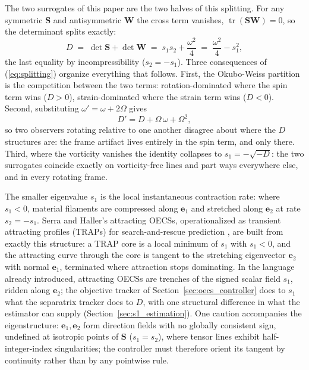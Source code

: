 \documentclass[lettersize,journal]{IEEEtran}
\begin{document}
The two surrogates of this paper are the two halves of this splitting.
For any symmetric $\mathbf{S}$ and antisymmetric $\mathbf{W}$ the cross
term vanishes, $\operatorname{tr}(\mathbf{S}\mathbf{W}) = 0$, so the
determinant splits exactly:
\begin{equation}
    D \;=\; \det\mathbf{S} + \det\mathbf{W}
      \;=\; s_1 s_2 + \frac{\omega^2}{4}
      \;=\; \frac{\omega^2}{4} - s_1^2,
    \label{eq:splitting}
\end{equation}
the last equality by incompressibility ($s_2 = -s_1$). Three
consequences of (\ref{eq:splitting}) organize everything that follows.
First, the Okubo-Weiss partition is the competition between the two
terms: rotation-dominated where the spin term wins ($D > 0$),
strain-dominated where the strain term wins ($D < 0$). Second,
substituting $\omega' = \omega + 2\Omega$ gives
\begin{equation}
    D' = D + \Omega\,\omega + \Omega^2,
    \label{eq:D_not_objective}
\end{equation}
so two observers rotating relative to one another disagree about where
the $D$ structures are: the frame artifact lives entirely in the spin
term, and only there. Third, where the vorticity vanishes the identity
collapses to $s_1 = -\sqrt{-D}$: the two surrogates coincide exactly on
vorticity-free lines and part ways everywhere else, and in every
rotating frame.

The smaller eigenvalue $s_1$ is the local instantaneous contraction
rate: where $s_1 < 0$, material filaments are compressed along
$\mathbf{e}_1$ and stretched along $\mathbf{e}_2$ at rate $s_2 = -s_1$.
Serra and Haller's attracting OECSs, operationalized as transient
attracting profiles (TRAPs) for search-and-rescue prediction
\cite{17,36}, are built from exactly this structure: a TRAP core is a
local minimum of $s_1$ with $s_1 < 0$, and the attracting curve through
the core is tangent to the stretching eigenvector $\mathbf{e}_2$ with
normal $\mathbf{e}_1$, terminated where attraction stops dominating. In
the language already introduced, attracting OECSs are trenches of the
signed scalar field $s_1$, ridden along $\mathbf{e}_2$; the objective
tracker of Section~\ref{sec:oecs_controller} does to $s_1$ what the
separatrix tracker does to $D$, with one structural difference in what
the estimator can supply (Section~\ref{sec:s1_estimation}). One caution
accompanies the eigenstructure: $\mathbf{e}_1, \mathbf{e}_2$ form
direction fields with no globally consistent sign, undefined at
isotropic points of $\mathbf{S}$ ($s_1 = s_2$), where tensor lines
exhibit half-integer-index singularities; the controller must therefore
orient its tangent by continuity rather than by any pointwise rule.
\end{document}
